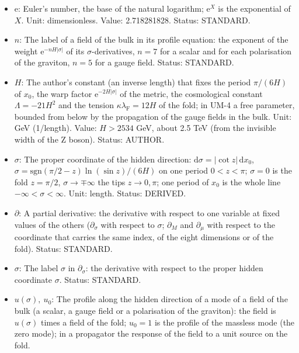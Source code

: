 \documentclass[
  10pt,
]{article}
\providecommand{\tightlist}{%
  \setlength{\itemsep}{0pt}\setlength{\parskip}{0pt}}
\begin{document}
\begin{itemize}
\tightlist
\item
  \(\mathrm{e}\): Euler's number, the base of the natural logarithm;
  \(\mathrm{e}^{X}\) is the exponential of \(X\). Unit: dimensionless.
  Value: 2.718281828. Status: STANDARD.
\item
  \(n\): The label of a field of the bulk in its profile equation: the
  exponent of the weight \(\mathrm{e}^{-nH\lvert\sigma\rvert}\) of its
  \(\sigma\)-derivatives, \(n = 7\) for a scalar and for each
  polarisation of the graviton, \(n = 5\) for a gauge field. Status:
  STANDARD.
\item
  \(H\): The author's constant (an inverse length) that fixes the period
  \(\pi/(6H)\) of \(x_0\), the warp factor
  \(\mathrm{e}^{-2H\lvert\sigma\rvert}\) of the metric, the cosmological
  constant \(\Lambda = -21H^2\) and the tension
  \(\kappa\lambda_{\mathrm{F}} = 12H\) of the fold; in UM-4 a free
  parameter, bounded from below by the propagation of the gauge fields
  in the bulk. Unit: GeV (1/length). Value: \(H > 2534\) GeV, about 2.5
  TeV (from the invisible width of the Z boson). Status: AUTHOR.
\item
  \(\sigma\): The proper coordinate of the hidden direction:
  \(\mathrm{d}\sigma = \lvert\cot z\rvert\,\mathrm{d}x_0\),
  \(\sigma = \mathrm{sgn}(\pi/2 - z)\ln(\sin z)/(6H)\) on one period
  \(0 < z < \pi\); \(\sigma = 0\) is the fold \(z = \pi/2\),
  \(\sigma \to \mp\infty\) the tips \(z \to 0, \pi\); one period of
  \(x_0\) is the whole line \(-\infty < \sigma < \infty\). Unit: length.
  Status: DERIVED.
\item
  \(\partial\): A partial derivative: the derivative with respect to one
  variable at fixed values of the others (\(\partial_\sigma\) with
  respect to \(\sigma\); \(\partial_M\) and \(\partial_\mu\) with
  respect to the coordinate that carries the same index, of the eight
  dimensions or of the fold). Status: STANDARD.
\item
  \(\sigma\): The label \(\sigma\) in \(\partial_\sigma\): the
  derivative with respect to the proper hidden coordinate \(\sigma\).
  Status: STANDARD.
\item
  \(u(\sigma),\ u_0\): The profile along the hidden direction of a mode
  of a field of the bulk (a scalar, a gauge field or a polarisation of
  the graviton): the field is \(u(\sigma)\) times a field of the fold;
  \(u_0 = 1\) is the profile of the massless mode (the zero mode); in a
  propagator the response of the field to a unit source on the fold.

\end{itemize}
\end{document}
